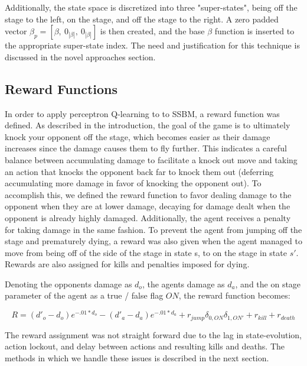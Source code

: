 Additionally, the state space is discretized into three "super-states", being off the stage to the left, on the stage, and off the stage to the right. A zero padded vector $\beta_{p} = [\beta,~0_{|\beta|},~0_{|\beta|}]$ is then created, and the base $\beta$ function is inserted to the appropriate super-state index. The need and  justification for this technique is discussed in the novel approaches section.

\subsection{Reward Functions}

In order to apply perceptron Q-learning to to SSBM, a reward function was defined. As described in the introduction, the goal of the game is to ultimately knock your opponent off the stage, which becomes easier as their damage increases since the damage causes them to fly further. This indicates a careful balance between accumulating damage to facilitate a knock out move and taking an action that knocks the opponent back far to knock them out (deferring accumulating more damage in favor of knocking the opponent out). To accomplish this, we defined the reward function to favor dealing damage to the opponent when they are at lower damage, decaying for damage dealt when the opponent is already highly damaged. Additionally, the agent receives a penalty for taking damage in the same fashion. To prevent the agent from jumping off the stage and prematurely dying, a reward was also given when the agent managed to move from being off of the side of the stage in state s, to on the stage in state $s'$. Rewards are also assigned for kills and penalties imposed for dying.

Denoting the opponents damage as $d_o$, the agents damage as $d_a$, and the on stage parameter of the agent as a true / false flag $ON$, the reward function becomes:

\vspace{-6mm}
\begin{equation}
R = (d'_o-d_o)e^{-.01*d_o} - (d'_a-d_a)e^{-.01*d_a} + r_{jump}\delta_{0,ON}\delta_{1,ON'}  + r_{kill} + r_{death}
\end{equation}
\vspace{-8mm}

The reward assignment was not straight forward due to the lag in state-evolution, action lockout, and delay between actions and resulting kills and deaths. The methods in which we handle these issues is described in the next section.
